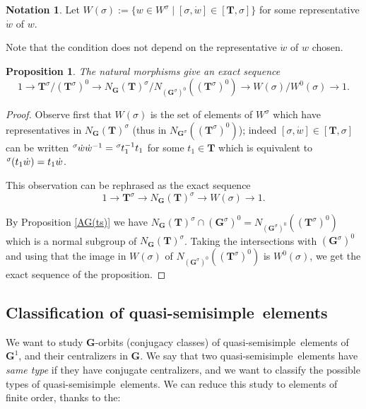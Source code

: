 \documentclass{amsart}
\newtheorem{proposition}[equation]{Proposition}
\numberwithin{equation}{section}
\theoremstyle{definition}
\newtheorem{notation}[equation]{Notation}
\theoremstyle{remark}
\newcommand\bG{{\mathbf G}}
\newcommand\bT{{\mathbf T}}
\newcommand\Gun{{\bG^1}}
\newcommand\Gs{{\bG^\sigma}}
\newcommand\Gso{{(\Gs)^0}}
\newcommand\Tso{{(\bT^\sigma)^0}}
\newcommand\Ts{{\bT^\sigma}}
\newcommand\lexp[2]{\kern\scriptspace\vphantom{#2}^{#1}\kern-\scriptspace#2}
\newcommand\inv{^{-1}}
\newcommand\qss{quasi-semisimple}
\begin{document}
\begin{notation}
Let $W(\sigma):=\{w\in W^\sigma\mid [\sigma,\dot w]\in[\bT,\sigma]\}$ for some
representative $\dot w$ of $w$.
\end{notation}
Note that the condition does not depend on the representative $\dot w$ of
$w$ chosen.

\begin{proposition}\label{exactsequence} The natural morphisms give an exact sequence
$$1\rightarrow \Ts/\Tso\rightarrow
N_\bG(\bT)^\sigma/N_\Gso(\Tso)\rightarrow
W(\sigma)/W^0(\sigma)\rightarrow 1.$$
\end{proposition}
\begin{proof}
Observe  first that $W(\sigma)$ is the set of elements of $W^\sigma$ which
have  representatives in $N_\bG(\bT)^\sigma$ (thus in $N_\Gs(\Tso)$);
indeed $[\sigma,\dot w]\in[\bT,\sigma]$ can be written $\lexp\sigma{\dot w} \dot
w\inv=\lexp\sigma t_1\inv t_1$ for some $t_1\in\bT$ which is equivalent to
$\lexp\sigma(t_1\dot w)=t_1\dot w$.

This observation can be rephrased as the exact sequence
$$1\rightarrow \Ts\rightarrow N_\bG(\bT)^\sigma\rightarrow
W(\sigma)\rightarrow1.$$

By Proposition \ref{AG(ts)} we have $N_\bG(\bT)^\sigma\cap\Gso =N_\Gso(\Tso)$ which is a
normal  subgroup  of  $N_\bG(\bT)^\sigma$.  Taking  the  intersections with
$\Gso$  and  using  that  the  image  in  $W(\sigma)$  of $N_\Gso(\Tso)$ is
$W^0(\sigma)$, we get the exact sequence of the proposition.
\end{proof}

\subsection*{Classification of \qss\ elements}
We want to study $\bG$-orbits (conjugacy classes) of \qss\ 
elements of $\Gun$, and their centralizers in $\bG$. 
We say that two \qss\ elements have {\em same type} if they have
conjugate centralizers, and we want to classify the possible types of \qss\
elements. We can reduce this study to elements of
finite order, thanks to the:
\end{document}
